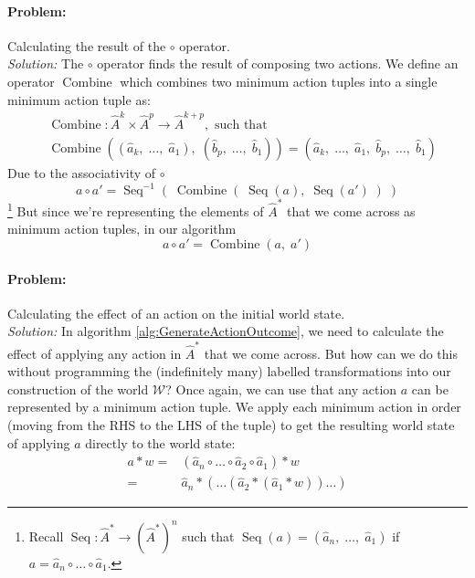 \paragraph{Problem:}
Calculating the result of the $\circ$ operator.
\\\textit{Solution:}
The $\circ$ operator finds the result of composing two actions.
We define an operator $\operatorname{Combine}$ which combines two minimum action tuples into a single minimum action tuple as:
\begin{equation}
	\begin{aligned}
		 & \operatorname{Combine}: \hat{A}^{k} \times \hat{A}^{p} \to \hat{A}^{k+p}, \text{ such that}                                                                                                     \\
		 & \operatorname{Combine}((\hat{a}_{k}, \; \dots, \; \hat{a}_{1}), \; (\hat{b}_{p}, \; \dots, \; \hat{b}_{1})) = (\hat{a}_{k}, \; \dots, \; \hat{a}_{1}, \; \hat{b}_{p}, \; \dots, \; \hat{b}_{1})
	\end{aligned}
\end{equation}
Due to the associativity of $\circ$
\begin{equation}
	a \circ a' = \operatorname{Seq}^{-1}(\;\operatorname{Combine}(\;\operatorname{Seq}(a), \; \operatorname{Seq}(a')\;)\;)
\end{equation}
\footnote{
	Recall $\operatorname{Seq}: \hat{A}^{*} \to (\hat{A}^{*})^{n}$ such that $\operatorname{Seq}(a) = (\hat{a}_{n}, \; \dots, \; \hat{a}_{1})$ if $a = \hat{a}_{n} \circ \dots \circ \hat{a}_{1}$.
}
But since we're representing the elements of $\hat{A}^{*}$ that we come across as minimum action tuples, in our algorithm
\begin{equation}
	a \circ a' = \operatorname{Combine}(a, \; a')
\end{equation}

\paragraph{Problem:}
Calculating the effect of an action on the initial world state.
\\\textit{Solution:}
In algorithm \ref{alg:GenerateActionOutcome}, we need to calculate the effect of applying any action in $\hat{A}^{*}$ that we come across.
But how can we do this without programming the (indefinitely many) labelled transformations into our construction of the world $\mathscr{W}$?
Once again, we can use that any action $a$ can be represented by a minimum action tuple.
We apply each minimum action in order (moving from the RHS to the LHS of the tuple) to get the resulting world state of applying $a$ directly to the world state:
\begin{equation}
	\begin{aligned}
		a * w = & (\hat{a}_{n} \circ \dots \circ \hat{a}_{2} \circ \hat{a}_{1}) * w \\
		=       & \hat{a}_{n} * ( \dots (\hat{a}_{2} * (\hat{a}_{1} * w)) \dots)
	\end{aligned}
\end{equation}




